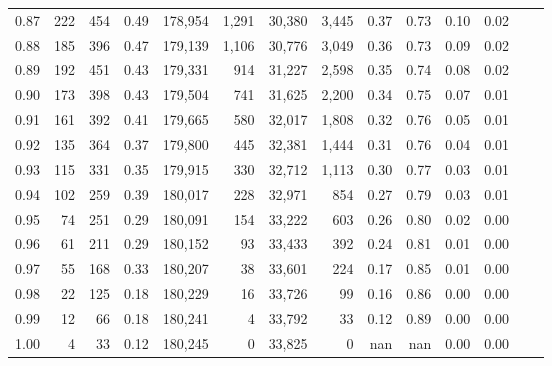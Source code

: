 \begin{tabular}{rrrrrrrrrrrrrr}
0.87 &    222 &  454 &    0.49 &  178,954 &    1,291 &  30,380 &   3,445 &  0.37 &  0.73 &  0.10 &      0.02 \\
0.88 &    185 &  396 &    0.47 &  179,139 &    1,106 &  30,776 &   3,049 &  0.36 &  0.73 &  0.09 &      0.02 \\
0.89 &    192 &  451 &    0.43 &  179,331 &      914 &  31,227 &   2,598 &  0.35 &  0.74 &  0.08 &      0.02 \\
0.90 &    173 &  398 &    0.43 &  179,504 &      741 &  31,625 &   2,200 &  0.34 &  0.75 &  0.07 &      0.01 \\
0.91 &    161 &  392 &    0.41 &  179,665 &      580 &  32,017 &   1,808 &  0.32 &  0.76 &  0.05 &      0.01 \\
0.92 &    135 &  364 &    0.37 &  179,800 &      445 &  32,381 &   1,444 &  0.31 &  0.76 &  0.04 &      0.01 \\
0.93 &    115 &  331 &    0.35 &  179,915 &      330 &  32,712 &   1,113 &  0.30 &  0.77 &  0.03 &      0.01 \\
0.94 &    102 &  259 &    0.39 &  180,017 &      228 &  32,971 &     854 &  0.27 &  0.79 &  0.03 &      0.01 \\
0.95 &     74 &  251 &    0.29 &  180,091 &      154 &  33,222 &     603 &  0.26 &  0.80 &  0.02 &      0.00 \\
0.96 &     61 &  211 &    0.29 &  180,152 &       93 &  33,433 &     392 &  0.24 &  0.81 &  0.01 &      0.00 \\
0.97 &     55 &  168 &    0.33 &  180,207 &       38 &  33,601 &     224 &  0.17 &  0.85 &  0.01 &      0.00 \\
0.98 &     22 &  125 &    0.18 &  180,229 &       16 &  33,726 &      99 &  0.16 &  0.86 &  0.00 &      0.00 \\
0.99 &     12 &   66 &    0.18 &  180,241 &        4 &  33,792 &      33 &  0.12 &  0.89 &  0.00 &      0.00 \\
1.00 &      4 &   33 &    0.12 &  180,245 &        0 &  33,825 &       0 &   nan &   nan &  0.00 &      0.00 \\
\bottomrule
\end{tabular}
